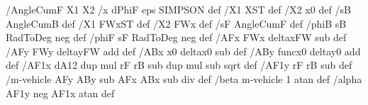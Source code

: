 {{/AngleCumF { %
 X1 X2 /x {dPhiF} eps SIMPSON
 } def
/X1 XST def /X2 x0 def %
/sB AngleCumB def %
/X1 FWxST def /X2 FWx def
/sF AngleCumF def %
/phiB sB RadToDeg neg def
/phiF sF RadToDeg neg def
/AFx FWx deltaxFW sub def %
/AFy FWy deltayFW add def %
/ABx x0 deltax0 sub def %
/ABy funcx0 deltay0 add def %
/AF1x dA12 dup mul rF rB sub dup mul sub sqrt def
/AF1y rF rB sub def
/m-vehicle AFy ABy sub AFx ABx sub div def
/beta m-vehicle 1 atan def %
/alpha AF1y neg AF1x atan def %
}}
